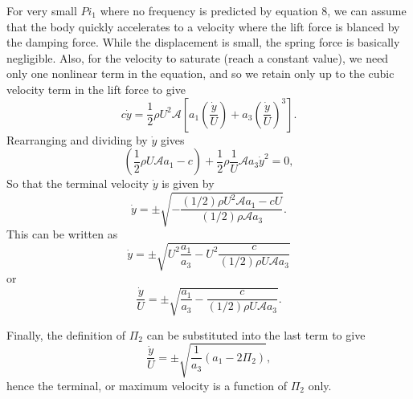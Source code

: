 For very small $Pi_1$ where no frequency is predicted by equation 8,
we can assume that the body quickly accelerates to a velocity where
the lift force is blanced by the damping force. While the displacement
is small, the spring force is basically negligible. Also, for the
velocity to saturate (reach a constant value), we need only one
nonlinear term in the equation, and so we retain only up to the cubic
velocity term in the lift force to give
\begin{equation}
  c\dot{y} = \frac{1}{2}\rho U^2\mathcal{A}\left[a_1\left(\frac{\dot{y}}{U}\right) + a_3\left(\frac{\dot{y}}{U}\right)^3\right].
\end{equation}
Rearranging and dividing by $\dot{y}$ gives
\begin{equation}
  \left(\frac{1}{2}\rho U\mathcal{A}a_1 - c\right) + \frac{1}{2}\rho\frac{1}{U}\mathcal{A}a_3\dot{y}^2 = 0,
\end{equation}
So that the terminal velocity $\dot{y}$ is given by
\begin{equation}
  \dot{y} = \pm\sqrt{-\frac{(1/2)\rho U^2\mathcal{A}a_1 - cU}{(1/2)\rho\mathcal{A}a_3}}.
\end{equation}
This can be written as
\begin{equation}
  \dot{y} = \pm\sqrt{U^2\frac{a_1}{a_3} - U^2\frac{c}{(1/2)\rho U\mathcal{A}a_3}}
\end{equation}
or
\begin{equation}
  \frac{\dot{y}}{U} = \pm\sqrt{\frac{a_1}{a_3} - \frac{c}{(1/2)\rho U\mathcal{A}a_3}}.
\end{equation}

Finally, the definition of $\Pi_2$ can be substituted into the last term to give
\begin{equation}
  \frac{\dot{y}}{U} = \pm\sqrt{\frac{1}{a_3}(a_1 - 2\Pi_2)},
\end{equation}
hence the terminal, or maximum velocity is a function of $\Pi_2$ only.

